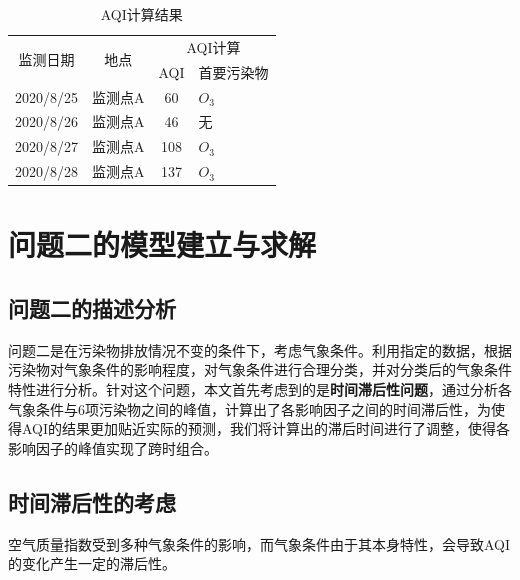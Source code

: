 \documentclass[a4paper,10pt]{my_paper}
\numberwithin{equation}{section}
\begin{document}
\begin{table}[h!]
    \centering
    \caption{AQI计算结果}\label{tab3}%
      \begin{tabular}{cccp{5em}}
      \toprule
      \multirow{2}[2]{*}{监测日期} & \multirow{2}[2]{*}{地点} & \multicolumn{2}{c}{AQI计算} \\
            &       & \multicolumn{1}{p{4.055em}}{AQI} & 首要污染物 \\
      \midrule
      2020/8/25 & 监测点A  & 60    & ${O_3}$ \\
      2020/8/26 & 监测点A  & 46    & 无 \\
      2020/8/27 & 监测点A  & 108   & ${O_3}$ \\
      2020/8/28 & 监测点A  & 137   & ${O_3}$ \\
      \bottomrule
      \end{tabular}%
  \end{table}%
  


\section{问题二的模型建立与求解}
\subsection{问题二的描述分析}
问题二是在污染物排放情况不变的条件下，考虑气象条件。利用指定的数据，根据污染物对气象条件的影响程度，对气象条件进行合理分类，并对分类后的气象条件特性进行分析。针对这个问题，本文首先考虑到的是\textbf{时间滞后性问题}，通过分析各气象条件与6项污染物之间的峰值，计算出了各影响因子之间的时间滞后性，为使得AQI的结果更加贴近实际的预测，我们将计算出的滞后时间进行了调整，使得各影响因子的峰值实现了跨时组合。

\subsection{时间滞后性的考虑}
空气质量指数受到多种气象条件的影响，而气象条件由于其本身特性，会导致AQI的变化产生一定的滞后性。
\end{document}
